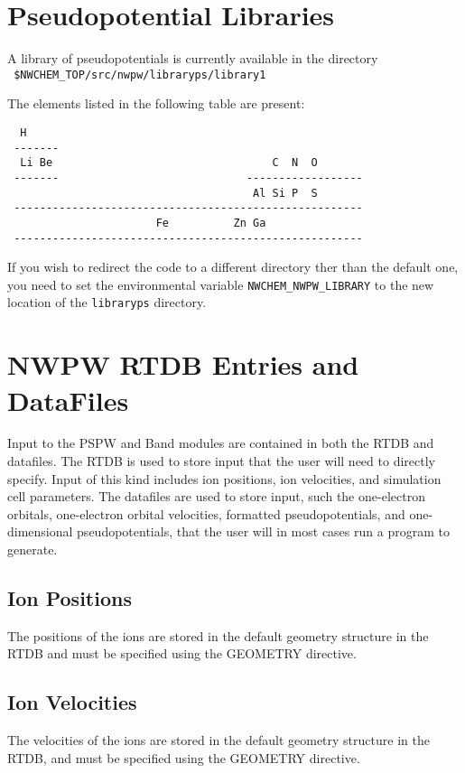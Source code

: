 \section{Pseudopotential Libraries}
\label{sec:psp_library}

A library of pseudopotentials is currently available  in the
directory \\
\verb+ $NWCHEM_TOP/src/nwpw/libraryps/library1+

The elements listed in the following table are present:

\begin{verbatim}
  H
 -------
  Li Be                                  C  N  O
 -------                             ------------------
                                      Al Si P  S  
 ------------------------------------------------------
                       Fe          Zn Ga               
 ------------------------------------------------------
\end{verbatim}

If you wish to redirect the code to a different directory ther than
the default one, 
you need to set the environmental variable
{\tt NWCHEM\_NWPW\_LIBRARY}
to the new location of the \verb+libraryps+ directory.



\section{NWPW RTDB Entries and DataFiles}
\label{sec:pspw_data}
Input to the PSPW and Band modules are contained in both the RTDB and datafiles.
The RTDB is used to store input that the user will need to directly specify.
Input of this kind includes ion positions, ion velocities, and simulation cell
parameters.  The datafiles are used to store input, such the one-electron 
orbitals, one-electron orbital velocities, formatted pseudopotentials, 
and one-dimensional pseudopotentials, that the user will in most cases
run a program to generate.

\subsection{Ion Positions}
The positions of the ions are stored in the default geometry structure
in the RTDB and must be specified  using the GEOMETRY directive.

\subsection{Ion Velocities}
The velocities of the ions are stored in the default geometry structure
in the RTDB, and must be specified using the GEOMETRY directive.


